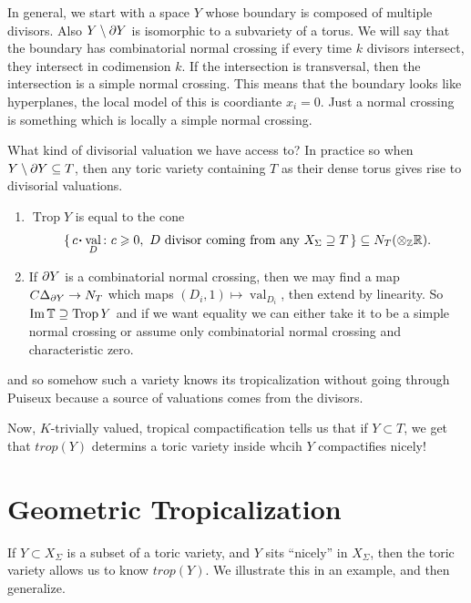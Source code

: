 \documentclass[12pt]{memoir}
\DeclareMathOperator{\val}{val}
\DeclareMathOperator{\Trop}{Trop}
\theoremstyle{definition}
\begin{document}
In general, we start with a space $Y$ whose boundary is composed of multiple divisors. Also $Y\setminus\partial Y$ is isomorphic to a subvariety of a torus. We will say that the boundary has combinatorial normal crossing if every time $k$ divisors intersect, they intersect in codimension $k$. If the intersection is transversal, then the intersection is a simple normal crossing. This means that the boundary looks like hyperplanes, the local model of this is coordiante $x_i=0$. Just a normal crossing is something which is locally a simple normal crossing.\par
What kind of divisorial valuation we have access to? In practice  so when $Y\setminus\partial Y\subseteq T$, then any toric variety containing $T$ as their dense torus gives rise to divisorial valuations.
\begin{enumerate}
    \item $\Trop Y$ is equal to the cone 
    $$\set{c\.\val_D\:\ c\geq 0,\ D\ \text{divisor coming from any }X_\Sg\supseteq T}\subseteq N_T(\ox_\bZ\bR).$$
    \item If $\partial Y$ is a combinatorial normal crossing, then we may find a map $C\Delta_{\partial Y}\to N_T$ which maps $(D_i,1)\mapsto \val_{D_i}$, then extend by linearity. So $\Im\bT\supseteq\Trop Y$ and if we want equality we can either take it to be a simple normal crossing or assume only combinatorial normal crossing and characteristic zero.
\end{enumerate}
and so somehow such a variety knows its tropicalization without going through Puiseux because a source of valuations comes from the divisors. 






Now, $K$-trivially valued, tropical compactification tells us that if $Y \subset T$, we get that $trop(Y)$ determins a toric variety inside whcih $Y$ compactifies nicely!

\section{Geometric Tropicalization}

If $Y\subset X_\Sigma$ is  a subset of a toric variety, and $Y$ sits ``nicely'' in $X_\Sigma$, then the toric variety allows us to know $trop(Y)$. We illustrate this in an example, and then generalize.
\end{document}
